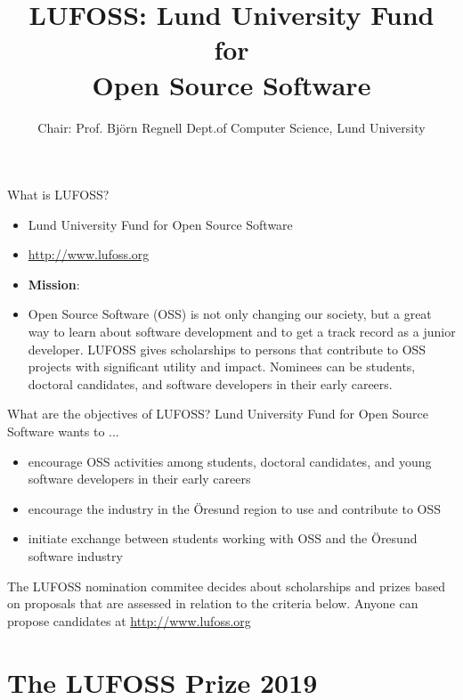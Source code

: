 \documentclass[aspectratio=169]{beamer}
\title[LUFOSS]{LUFOSS: \vspace{0.25em}\newline \fontsize{16}{25}\selectfont Lund University Fund for\\Open Source Software }
\author[www.lufoss.org]{%
  Chair: Prof. Björn Regnell\newline
  Dept.\@ of Computer Science, Lund University}
\newcommand{\TitleSlide}{\begin{frame}[plain]\titlepage\end{frame}}
\newcommand{\Section}[1]{\titleimagecolor{red}\section{#1}}
\newenvironment{Slide}[1]%
  {\begin{frame}[environment=Slide]{#1}}
  {\end{frame}}%
\begin{document}
\TitleSlide


\begin{Slide}{What is LUFOSS?}
\begin{itemize}
    \item Lund University Fund for Open Source Software
    \item \url{http://www.lufoss.org}
    \item \textbf{Mission}:
    \item[] Open Source Software (OSS) is not only changing our society, but a great way to learn about software development and to get a track record as a junior developer. LUFOSS gives scholarships to persons that contribute to OSS projects with significant utility and impact. Nominees can be students, doctoral candidates, and software developers in their early careers.
\end{itemize}
\end{Slide}

\begin{Slide}{What are the objectives of LUFOSS?}
  Lund University Fund for Open Source Software wants to ...
      \begin{itemize}
        \item encourage OSS activities among students, doctoral candidates, and young software developers in their early careers
        \item  encourage the industry in the Öresund region to use and contribute to OSS
        \item  initiate exchange between students working with OSS and the Öresund software industry
    \end{itemize}
    The LUFOSS nomination commitee decides about scholarships and prizes based on proposals that are assessed in relation to the criteria below. Anyone can propose candidates at \url{http://www.lufoss.org}  
  \end{Slide}
  


\Section{The LUFOSS Prize 2019}
\end{document}
